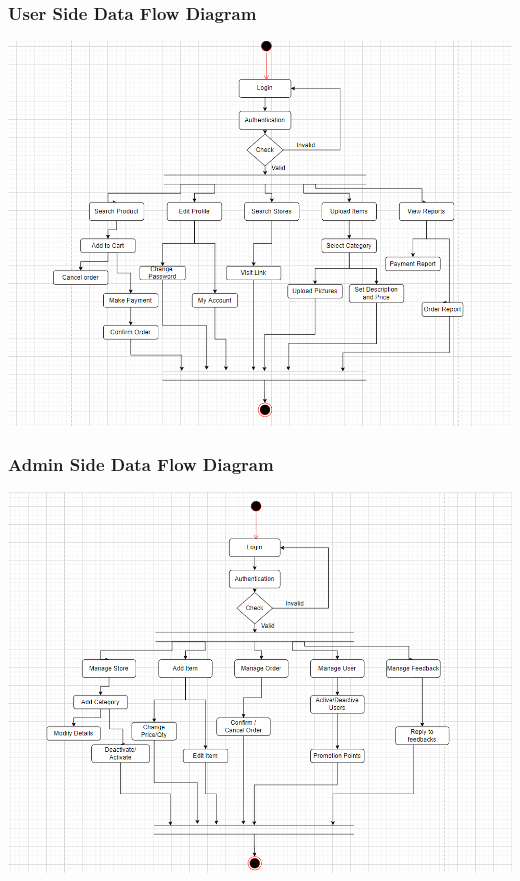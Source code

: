 \subsubsection{User Side Data Flow Diagram }
\includegraphics[scale = 0.6]{Diag/user-dfd.png}
\label{fig:Contex Level}


\subsubsection{Admin Side Data Flow Diagram }
\includegraphics[scale=.8]{Diag/admin-dfd.png}
\label{fig:Contex Level}





\